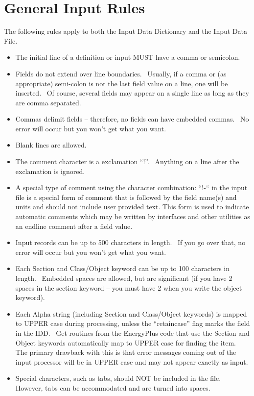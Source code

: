\section{General Input Rules}\label{general-input-rules}

The following rules apply to both the Input Data Dictionary and the Input Data File.

\begin{itemize}
\item
  The initial line of a definition or input MUST have a comma or semicolon.
\item
  Fields do not extend over line boundaries.~ Usually, if a comma or (as appropriate) semi-colon is not the last field value on a line, one will be inserted.~ Of course, several fields may appear on a single line as long as they are comma separated.
\item
  Commas delimit fields -- therefore, no fields can have embedded commas.~ No error will occur but you won't get what you want.
\item
  Blank lines are allowed.
\item
  The comment character is a exclamation ``!''.~ Anything on a line after the exclamation is ignored.
\item
  A special type of comment using the character combination: ``!-`` in the input file is a special form of comment that is followed by the field name(s) and units and should not include user provided text. This form is used to indicate automatic comments which may be written by interfaces and other utilities as an endline comment after a field value.
\item
  Input records can be up to 500 characters in length.~ If you go over that, no error will occur but you won't get what you want.
\item
  Each Section and Class/Object keyword can be up to 100 characters in length.~ Embedded spaces are allowed, but are significant (if you have 2 spaces in the section keyword -- you must have 2 when you write the object keyword).
\item
  Each Alpha string (including Section and Class/Object keywords) is mapped to UPPER case during processing, unless the ``retaincase'' flag marks the field in the IDD. ~Get routines from the EnergyPlus code that use the Section and Object keywords automatically map to UPPER case for finding the item.~ The primary drawback with this is that error messages coming out of the input processor will be in UPPER case and may not appear exactly as input.
\item
  Special characters, such as tabs, should NOT be included in the file.~ However, tabs can be accommodated and are turned into spaces.
\end{itemize}
